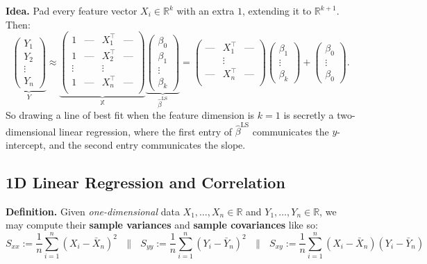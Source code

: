 \textbf{Idea.}
Pad every feature vector $X_i \in \mathbb{R}^k$
with an extra $1$, extending it to $\mathbb{R}^{k + 1}$.  Then:
\[
\underbrace{
\begin{pmatrix}
Y_1 \\ Y_2 \\ \vdots \\ Y_n
\end{pmatrix}
}_{Y}
\approx
\underbrace{
\begin{pmatrix}
1 & \text{---} & X_1^{\top} & \text{---} \\
1 & \text{---} & X_2^{\top} & \text{---} \\
\vdots & & \vdots & \\
1 & \text{---} & X_n^{\top} & \text{---} \\
\end{pmatrix}
}_{\mathbb{X}}
\underbrace{
\begin{pmatrix}
\beta_0 \\ \beta_1 \\ \vdots \\ \beta_k
\end{pmatrix}
}_{\hat{\beta}^{\mathrm{LS}}}
=
\begin{pmatrix}
\text{---} & X_1^{\top} & \text{---} \\
& \vdots & \\
\text{---} & X_n^{\top} & \text{---} \\
\end{pmatrix}
\begin{pmatrix}
\beta_1 \\ \vdots \\ \beta_k
\end{pmatrix}
+ \begin{pmatrix}
\beta_0 \\ \vdots \\ \beta_0
\end{pmatrix}.
\]
So drawing a line of best fit
when the feature dimension is $k = 1$
is secretly a two-dimensional linear regression,
where the first entry of $\hat{\beta}^{\mathrm{LS}}$
communicates the $y$-intercept,
and the second entry communicates the slope.

\subsection{1D Linear Regression and Correlation}

\textbf{Definition.}
Given \emph{one-dimensional} data
$X_1, \dots, X_n \in \mathbb{R}$
and $Y_1, \dots, Y_n \in \mathbb{R}$,
we may compute their
\textbf{sample variances} and \textbf{sample covariances}
like so:
\[ S_{xx} := \frac{1}{n} \sum_{i = 1}^n (X_i - \bar{X}_n)^2
~~~ \parallel ~~~
S_{yy} := \frac{1}{n} \sum_{i = 1}^n (Y_i - \bar{Y}_n)^2
~~~ \parallel ~~~
S_{xy} := \frac{1}{n} \sum_{i = 1}^n (X_i - \bar{X}_n)(Y_i - \bar{Y}_n) \]

